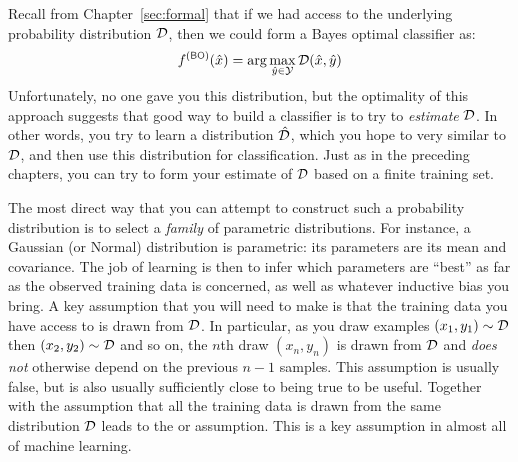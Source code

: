 Recall from Chapter~\ref{sec:formal} that if we had access to the underlying probability distribution $\mathcal{D}$, then we could form a Bayes optimal classifier as:
%
\begin{equation} \label{eq:prob:bayesopt2}
  f\xth{BO}(\hat x) = \arg\max_{\hat y \in \cY} \cD(\hat x, \hat y)
\end{equation}
%
Unfortunately, no one gave you this distribution, but the optimality of this approach
suggests that good way to build a classifier is to try to
\emph{estimate} $\mathcal{D}$.  In other words, you try to learn a
distribution $\hat {\mathcal{D}}$, which you hope to very similar to $\mathcal{D}$, and
then use this distribution for classification.  Just as in the
preceding chapters, you can try to form your estimate of $\mathcal{D}$ based
on a finite training set.

The most direct way that you can attempt to construct such a
probability distribution is to select a \emph{family} of parametric
distributions.  For instance, a Gaussian (or Normal) distribution is
parametric: its parameters are its mean and covariance.  The job of
learning is then to infer which parameters are ``best'' as far as the
observed training data is concerned, as well as whatever inductive
bias you bring.  A key assumption that you will need to make is that
the training data you have access to is drawn 
from $\mathcal{D}$.  In particular, as you draw examples $(x_1,y_1) \sim \mathcal{D}$
then $(x_2,y_2) \sim \mathcal{D}$ and so on, the $n$th draw $(x_n,y_n)$ is
drawn from $\mathcal{D}$ and \emph{does not} otherwise depend on the previous
$n-1$ samples.  This assumption is usually false, but is also usually
sufficiently close to being true to be useful.  Together with the
assumption that all the training data is drawn from the same
distribution $\mathcal{D}$ leads to the  or
 assumption.  This
is a key assumption in almost all of machine learning.

